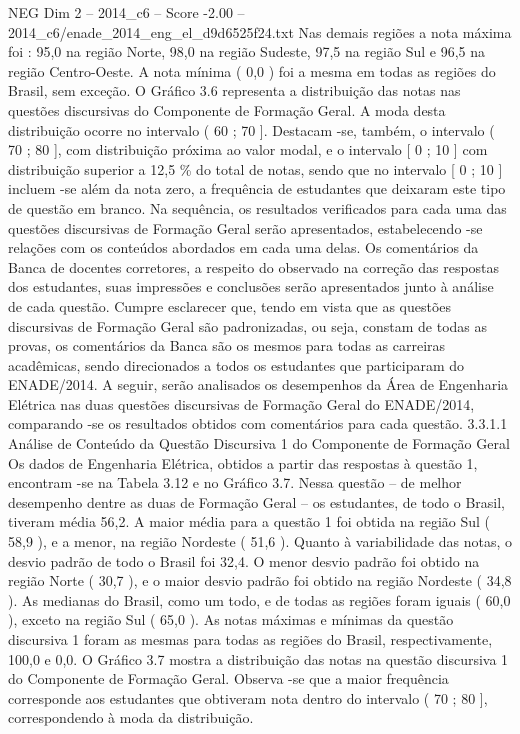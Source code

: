 \begin{textsample}{NEG Dim 2 – 2014\_c6 – Score -2.00 – 2014\_c6/enade\_2014\_eng\_el\_d9d6525f24.txt}
Nas demais regiões a nota máxima foi : 95,0 na região Norte, 98,0 na região Sudeste, 97,5 na região Sul e 96,5 na região Centro-Oeste.
A nota mínima ( 0,0 ) foi a mesma em todas as regiões do Brasil, sem exceção.
O Gráfico 3.6 representa a distribuição das notas nas questões discursivas do Componente de Formação Geral.
A moda desta distribuição ocorre no intervalo ( 60 ; 70 ].
Destacam -se, também, o intervalo ( 70 ; 80 ], com distribuição próxima ao valor modal, e o intervalo [ 0 ; 10 ] com distribuição superior a 12,5 \% do total de notas, sendo que no intervalo [ 0 ; 10 ] incluem -se além da nota zero, a frequência de estudantes que deixaram este tipo de questão em branco.
Na sequência, os resultados verificados para cada uma das questões discursivas de Formação Geral serão apresentados, estabelecendo -se relações com os conteúdos abordados em cada uma delas.
Os comentários da Banca de docentes corretores, a respeito do observado na correção das respostas dos estudantes, suas impressões e conclusões serão apresentados junto à análise de cada questão.
Cumpre esclarecer que, tendo em vista que as questões discursivas de Formação Geral são padronizadas, ou seja, constam de todas as provas, os comentários da Banca são os mesmos para todas as carreiras acadêmicas, sendo direcionados a todos os estudantes que participaram do ENADE/2014.
A seguir, serão analisados os desempenhos da Área de Engenharia Elétrica nas duas questões discursivas de Formação Geral do ENADE/2014, comparando -se os resultados obtidos com comentários para cada questão. 3.3.1.1 Análise de Conteúdo da Questão Discursiva 1 do Componente de Formação Geral Os dados de Engenharia Elétrica, obtidos a partir das respostas à questão 1, encontram -se na Tabela 3.12 e no Gráfico 3.7.
Nessa questão – de melhor desempenho dentre as duas de Formação Geral – os estudantes, de todo o Brasil, tiveram média 56,2.
A maior média para a questão 1 foi obtida na região Sul ( 58,9 ), e a menor, na região Nordeste ( 51,6 ).
Quanto à variabilidade das notas, o desvio padrão de todo o Brasil foi 32,4.
O menor desvio padrão foi obtido na região Norte ( 30,7 ), e o maior desvio padrão foi obtido na região Nordeste ( 34,8 ).
As medianas do Brasil, como um todo, e de todas as regiões foram iguais ( 60,0 ), exceto na região Sul ( 65,0 ).
As notas máximas e mínimas da questão discursiva 1 foram as mesmas para todas as regiões do Brasil, respectivamente, 100,0 e 0,0.
O Gráfico 3.7 mostra a distribuição das notas na questão discursiva 1 do Componente de Formação Geral.
Observa -se que a maior frequência corresponde aos estudantes que obtiveram nota dentro do intervalo ( 70 ; 80 ], correspondendo à moda da distribuição.

\end{textsample}
